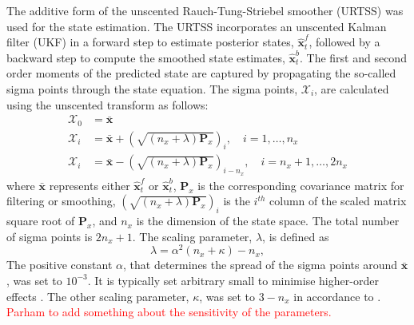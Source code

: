 \documentclass[review,authoryear,3p]{elsarticle}
\newcommand{\dean}[1]{\textcolor{red}{#1}}
\begin{document}
The additive form of the unscented Rauch-Tung-Striebel smoother (URTSS) \citep{Sarkka2010} was used for the state estimation. The URTSS incorporates an unscented Kalman filter (UKF) \citep{Julier1997, Merwe2003} in a forward step to estimate posterior states, $\hat{\mathbf x}_t^{f}$, followed by a backward step to compute the smoothed state estimates, $\hat{\mathbf x}_t^{b}$. The first and second order moments of the predicted state are captured by propagating the so-called sigma points through the state equation. The sigma points, $\mathcal X_i$, are calculated using the unscented transform as follows:
\begin{align}\label{eq:sigmapoints1}
	\mathcal X_{0}&=\mathbf{\bar x} \\
	\mathcal X_{i}&= \mathbf{\bar x}+\left(\sqrt{( n_x + \lambda)\mathbf P_x}\right)_i, \quad i=1, \dots, n_x \\
	\mathcal X_{i}&=\mathbf{\bar x}-\left(\sqrt{( n_x + \lambda)\mathbf P_x}\right)_{i- n_x}, \quad i= n_x+1, \dots, 2n_x 
\end{align}
where $\mathbf{\bar x}$ represents either $\hat{\mathbf x}_t^{f}$ or $\hat{\mathbf x}_t^{b}$, $\mathbf{P}_x$ is the corresponding covariance matrix for filtering or smoothing, $\left(\sqrt{( n_x + \lambda)\mathbf P_x}\right)_i$ is the $i^{th}$ column of the scaled matrix square root of $\mathbf P_x$, and $n_x$ is the dimension of the state space. The total number of sigma points is $2n_x+1$. The scaling parameter, $\lambda$, is defined as 
\begin{equation}\label{eq:sigmapoints3}
	\lambda=\alpha^2( n_x+\kappa) - n_x, 
\end{equation}
The positive constant $\alpha$, that determines the spread of the sigma points around $\mathbf{\bar x}$, was set to $10^{-3}$. It is typically set arbitrary small to minimise higher-order effects \citep{Haykin2001}. The other scaling parameter, $\kappa$, was set to $3-n_x$ in accordance to \citet{Julier2002a}. \dean{Parham to add something about the sensitivity of the parameters.}
\end{document}

